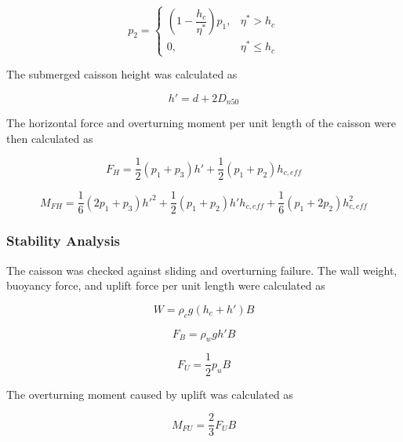 \documentclass[a4paper, 11pt]{article}
\begin{document}
\begin{equation}
    p_2=
    \begin{cases}
    \left(1-\dfrac{h_c}{\eta^*}\right)p_1, & \eta^*>h_c \\
    0, & \eta^*\leq h_c
    \end{cases}
\end{equation}

The submerged caisson height was calculated as

\begin{equation}
    h'=d+2D_{n50}
\end{equation}

The horizontal force and overturning moment per unit length of the caisson were then calculated as

\begin{equation}
    F_H=
    \frac{1}{2}(p_1+p_3)h'
    +
    \frac{1}{2}(p_1+p_2)h_{c,eff}
\end{equation}

\begin{equation}
    M_{FH}
    =
    \frac{1}{6}(2p_1+p_3)h'^2
    +
    \frac{1}{2}(p_1+p_2)h'h_{c,eff}
    +
    \frac{1}{6}(p_1+2p_2)h_{c,eff}^{2}
\end{equation}

\subsubsection{Stability Analysis}

\hspace*{0.5cm} The caisson was checked against sliding and overturning failure. The wall weight, buoyancy force, and uplift force per unit length were calculated as

\begin{equation}
    W=\rho_cg(h_c+h')B
\end{equation}

\begin{equation}
    F_B=\rho_wgh'B
\end{equation}

\begin{equation}
    F_U=\frac{1}{2}p_uB
\end{equation}

The overturning moment caused by uplift was calculated as

\begin{equation}
    M_{FU}=\frac{2}{3}F_UB
\end{equation}
\end{document}
